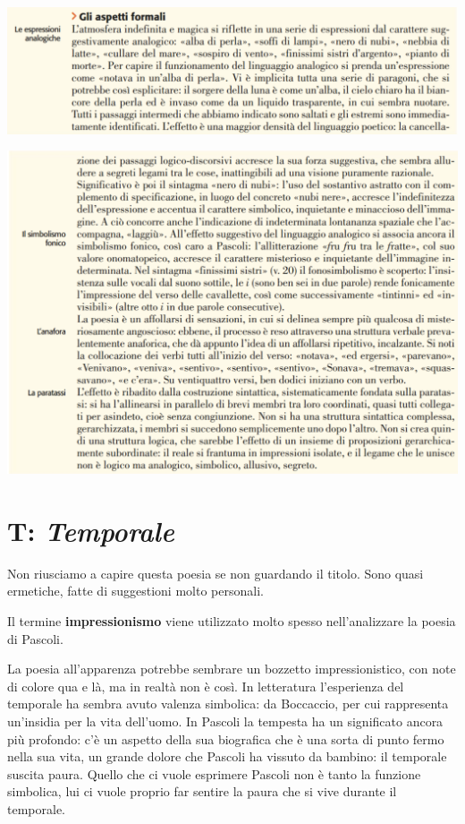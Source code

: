 \documentclass[a4paper, twoside, titlepage]{book}
\begin{document}
\begin{center}
\includegraphics[width=\textwidth]{assiuolo5}
\end{center}
\vfill
\begin{center}
\includegraphics[width=\textwidth]{assiuolo6}
\end{center}

\section{T: \textit{Temporale}}

Non riusciamo a capire questa poesia se non guardando il titolo. Sono quasi ermetiche, fatte di suggestioni molto personali.

Il termine \textbf{impressionismo} viene utilizzato molto spesso nell'analizzare la poesia di Pascoli.

La poesia all'apparenza potrebbe sembrare un bozzetto impressionistico, con note di colore qua e là, ma in realtà non è così.
In letteratura l'esperienza del temporale ha sembra avuto valenza simbolica: da Boccaccio, per cui rappresenta un'insidia per la vita dell'uomo.
In Pascoli la tempesta ha un significato ancora più profondo: c'è un aspetto della sua biografica che è una sorta di punto fermo nella sua vita, un grande dolore che Pascoli ha vissuto da bambino: il temporale suscita paura.
Quello che ci vuole esprimere Pascoli non è tanto la funzione simbolica, lui ci vuole proprio far sentire la paura che si vive durante il temporale.
\end{document}
